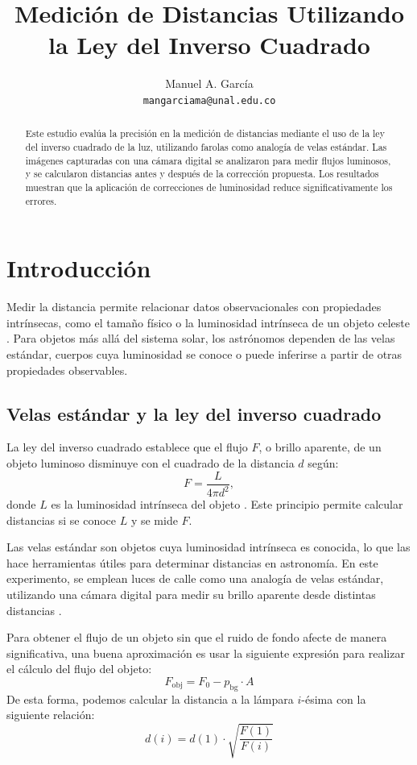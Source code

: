 \documentclass[a4paper,12pt]{article}
\title{Medición de Distancias Utilizando la Ley del Inverso Cuadrado}
\author{Manuel A. García \\ \texttt{mangarciama@unal.edu.co}}
\begin{document}
\maketitle

\begin{abstract}
Este estudio evalúa la precisión en la medición de distancias mediante el uso de la ley del inverso cuadrado de la luz, utilizando farolas como analogía de velas estándar. Las imágenes capturadas con una cámara digital se analizaron para medir flujos luminosos, y se calcularon distancias antes y después de la corrección propuesta. Los resultados muestran que la aplicación de correcciones de luminosidad reduce significativamente los errores. 
\end{abstract}

\section{Introducción}

Medir la distancia permite relacionar datos observacionales con propiedades intrínsecas, como el tamaño físico o la luminosidad intrínseca de un objeto celeste \cite{poessel2016}. Para objetos más allá del sistema solar, los astrónomos dependen de las velas estándar, cuerpos cuya luminosidad se conoce o puede inferirse a partir de otras propiedades observables.

\subsection{Velas estándar y la ley del inverso cuadrado}

La ley del inverso cuadrado establece que el flujo \(F\), o brillo aparente, de un objeto luminoso disminuye con el cuadrado de la distancia \(d\) según:
\begin{equation}
F = \frac{L}{4\pi d^2},
\label{eq:flujo}
\end{equation}
donde \(L\) es la luminosidad intrínseca del objeto \cite{poessel2016}. Este principio permite calcular distancias si se conoce \(L\) y se mide \(F\).

Las velas estándar son objetos cuya luminosidad intrínseca es conocida, lo que las hace herramientas útiles para determinar distancias en astronomía. En este experimento, se emplean luces de calle como una analogía de velas estándar, utilizando una cámara digital para medir su brillo aparente desde distintas distancias \cite{poessel2016}.

Para obtener el flujo de un objeto sin que el ruido de fondo afecte de manera significativa, una buena aproximación es usar la siguiente expresión para realizar el cálculo del flujo del objeto:
\begin{equation}
F_{\text{obj}} = F_0 - p_{\text{bg}} \cdot A
\label{eq:flujo_objeto}
\end{equation}
De esta forma, podemos calcular la distancia a la lámpara \(i\)-ésima con la siguiente relación:
\begin{equation}
d(i) = d(1) \cdot \sqrt{\frac{F(1)}{F(i)}}
\label{eq:d_prelim}
\end{equation}
\end{document}
